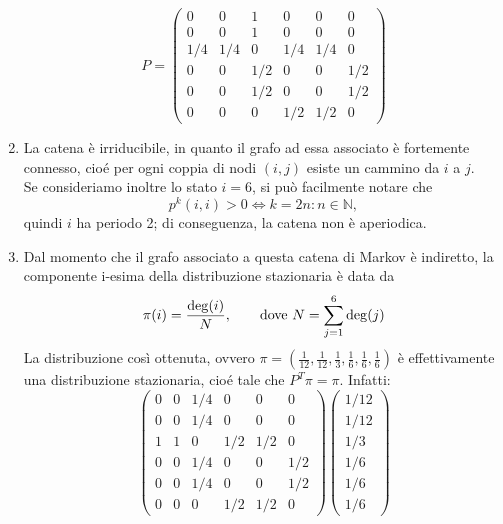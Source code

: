 \documentclass[
	12pt, %
]{fphw}
\begin{document}
\begin{enumerate}
	\begin{equation*}
		P = 
		\begin{pmatrix}
			0 & 0 & 1 & 0 & 0 & 0\\
			0 & 0 & 1 & 0 & 0 & 0\\
			1/4 & 1/4 & 0 & 1/4 & 1/4 & 0\\
			0 & 0 & 1/2 & 0 & 0 & 1/2\\
			0 & 0 & 1/2 & 0 & 0 & 1/2\\
			0 & 0 & 0 & 1/2 & 1/2 & 0
		\end{pmatrix}
	\end{equation*}
	\item La catena è irriducibile, in quanto il grafo ad essa associato è fortemente connesso, cioé 
	per ogni coppia di nodi $(i,j)$ esiste un cammino da $i$ a $j$.\\
	Se consideriamo inoltre lo stato $i = 6$, si può facilmente notare che
	\begin{equation*}
		p^{k}(i,i) > 0 \iff k = 2n : n \in \mathbb{N},
	\end{equation*}
	quindi $i$ ha periodo 2; di conseguenza, la catena non è aperiodica.
	\item Dal momento che il grafo associato a questa catena di Markov è indiretto, la componente i-esima della distribuzione stazionaria è data da 
	\begin{equation*}
		\pi(i) = \frac{\deg(i)}{N}, \qquad\textnormal{dove }N = \sum_{j=1}^6 \deg(j)
	\end{equation*}
	La distribuzione così ottenuta, ovvero $\pi = (\frac{1}{12}, \frac{1}{12}, \frac{1}{3}, \frac{1}{6}, \frac{1}{6}, \frac{1}{6})$ è effettivamente una distribuzione stazionaria, cioé tale che $P^T \pi = \pi$. Infatti:
	\begin{equation*}
		\begin{pmatrix}
			0 & 0 & 1/4 & 0 & 0 & 0\\
			0 & 0 & 1/4 & 0 & 0 & 0\\
			1 & 1 & 0 & 1/2 & 1/2 & 0\\
			0 & 0 & 1/4 & 0 & 0 & 1/2\\
			0 & 0 & 1/4 & 0 & 0 & 1/2\\
			0 & 0 & 0 & 1/2 & 1/2 & 0
		\end{pmatrix}
		\begin{pmatrix}
			1/12 \\ 1/12 \\ 1/3 \\ 1/6 \\ 1/6 \\ 1/6

\end{pmatrix}
\end{equation*}
\end{enumerate}
\end{document}
